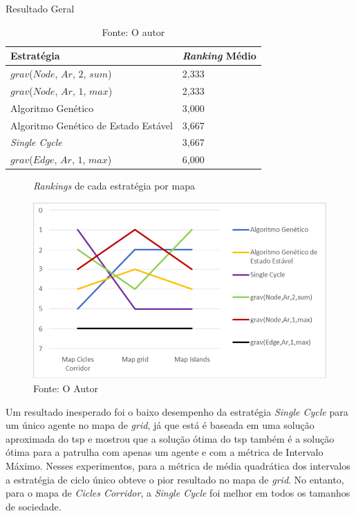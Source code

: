 \begin{table}
	\centering
	\caption{Resultado Geral}
	\label{ranking_medios}
	\begin{tabularx}{\linewidth}{|X|X|}
		\hline
		\textbf{Estratégia} & \textbf{\textit{Ranking} Médio} \\
		\hline
		$grav$($Node$, $Ar$, $2$, $sum$) & 2,333 \\
		\hline
		$grav$($Node$, $Ar$, $1$, $max$) & 2,333 \\
		\hline
		Algoritmo Genético & 3,000 \\
		\hline
		Algoritmo Genético de Estado Estável & 3,667 \\
		\hline
		\textit{Single Cycle} & 3,667 \\
		\hline
		$grav$($Edge$, $Ar$, $1$, $max$) & 6,000 \\
		\hline
	\end{tabularx}
	\caption*{Fonte: O autor}
\end{table}

\begin{figure}
	\caption[\textit{Rankings} de cada estratégia por mapa]{\textit{Rankings} de 
		cada estratégia por mapa}
	\centering
	\includegraphics[width=\columnwidth]{images/rank_all.png}
	\caption*{Fonte: O Autor}
	\label{fig:rank_all}
\end{figure}

Um resultado inesperado foi o baixo desempenho da estratégia 
\textit{Single Cycle} para um único agente no mapa de \textit{grid}, já que está 
é baseada em uma solução aproximada do \ac{tsp} e 
\citep{Chevaleyre:2004:TAM:1018411.1019013} mostrou que a solução ótima do 
\ac{tsp} também é a solução ótima para a patrulha com apenas um agente e com a 
métrica de Intervalo Máximo. Nesses experimentos, para a métrica de média 
quadrática dos intervalos a estratégia de ciclo único obteve o pior resultado no 
mapa de \textit{grid}. No entanto, para o mapa de \textit{Cicles Corridor}, a 
\textit{Single Cycle} foi melhor em todos os tamanhos de sociedade.


